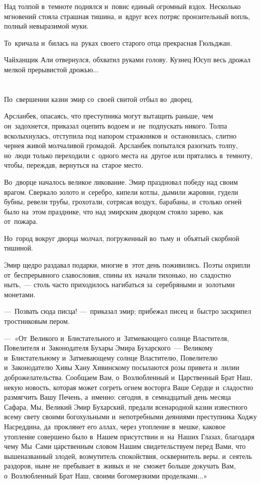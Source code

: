 \documentclass[12pt,a4paper]{book}
\begin{document}
Над толпой в~темноте поднялся и~повис единый огромный вздох. Несколько мгновений стояла страшная тишина, и~вдруг всех потряс пронзительный вопль, полный невыразимой муки.

То~кричала и~билась на~руках своего старого отца прекрасная Гюльджан.

Чайханщик Али отвернулся, обхватил руками голову. Кузнец Юсуп весь дрожал мелкой прерывистой дрожью...


\chapter{}

По~свершении казни эмир со~своей свитой отбыл во~дворец.

Арсланбек, опасаясь, что преступника могут вытащить раньше, чем он~задохнется, приказал оцепить водоем и~не~подпускать никого. Толпа всколыхнулась, отступила под напором стражников и~остановилась, слитно чернея живой молчаливой громадой. Арсланбек попытался разогнать толпу, но~люди только переходили с~одного места на~другое или прятались в~темноту, чтобы, переждав, вернуться на~старое место.

Во~дворце началось великое ликование. Эмир праздновал победу над своим врагом. Сверкало золото и~серебро, кипели котлы, дымили жаровни, гудели бубны, ревели трубы, грохотали, сотрясая воздух, барабаны, и~столько огней было на~этом празднике, что над эмирским дворцом стояло зарево, как от~пожара.

Но~город вокруг дворца молчал, погруженный во~тьму и~объятый скорбной тишиной.

Эмир щедро раздавал подарки, многие в~этот день поживились. Поэты охрипли от~беспрерывного славословия, спины их~начали тихонько, но~сладостно ныть,~— столь часто приходилось нагибаться за~серебряными и~золотыми монетами.

—~Позвать сюда писца! —~приказал эмир; прибежал писец и~быстро заскрипел тростниковым пером.

—~«От~Великого и~Блистательного и~Затмевающего солнце Властителя, Повелителя и~Законодателя Бухары Эмира Бухарского~— Великому и~Блистательному и~Затмевающему солнце Властителю, Повелителю и~Законодателю Хивы Хану Хивинскому посылаются розы привета и~лилии доброжелательства. Сообщаем Вам, о~Возлюбленный и~Царственный Брат Наш, некую новость, которая может согреть огнем восторга Ваше Сердце и~сладостно размягчить Вашу Печень, а~именно: сегодня, в~семнадцатый день месяца Сафара, Мы, Великий Эмир Бухарский, предали всенародной казни известного всему свету своими богохульными и~непотребными деяниями преступника Ходжу Насреддина, да~проклянет его аллах, через утопление в~мешке, каковое утопление совершено было в~Нашем присутствии и~на~Наших Глазах, благодаря чему Мы~Сами царственным словом Нашим свидетельствуем перед Вами, что вышеназванный злодей, возмутитель спокойствия, осквернитель веры. и~сеятель раздоров, ныне не~пребывает в~живых и~не~сможет больше докучать Вам, о~Возлюбленный Брат Наш, своими богомерзкими проделками...»
\end{document}
